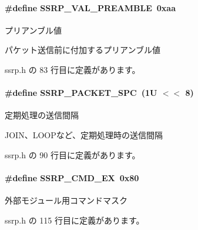 \paragraph[{S\+S\+R\+P\+\_\+\+V\+A\+L\+\_\+\+P\+R\+E\+A\+M\+B\+L\+E}]{\setlength{\rightskip}{0pt plus 5cm}\#define S\+S\+R\+P\+\_\+\+V\+A\+L\+\_\+\+P\+R\+E\+A\+M\+B\+L\+E~0xaa}\label{ssrp_8h_a8effb0515a3a94dc375d8d2f06daf627_a8effb0515a3a94dc375d8d2f06daf627}


プリアンブル値 

パケット送信前に付加するプリアンブル値 

 ssrp.\+h の 83 行目に定義があります。

\paragraph[{S\+S\+R\+P\+\_\+\+P\+A\+C\+K\+E\+T\+\_\+\+S\+P\+C}]{\setlength{\rightskip}{0pt plus 5cm}\#define S\+S\+R\+P\+\_\+\+P\+A\+C\+K\+E\+T\+\_\+\+S\+P\+C~(1\+U $<$$<$ 8)}\label{ssrp_8h_acb6a8cfed76fc5f18e699e7f476491ea_acb6a8cfed76fc5f18e699e7f476491ea}


定期処理の送信間隔 

J\+O\+I\+N、\+L\+O\+O\+Pなど、定期処理時の送信間隔 

 ssrp.\+h の 90 行目に定義があります。

\paragraph[{S\+S\+R\+P\+\_\+\+C\+M\+D\+\_\+\+E\+X}]{\setlength{\rightskip}{0pt plus 5cm}\#define S\+S\+R\+P\+\_\+\+C\+M\+D\+\_\+\+E\+X~0x80}\label{ssrp_8h_a76d2edb3e4836c0d2444a1627ea57f1b_a76d2edb3e4836c0d2444a1627ea57f1b}


外部モジュール用コマンドマスク 



 ssrp.\+h の 115 行目に定義があります。

